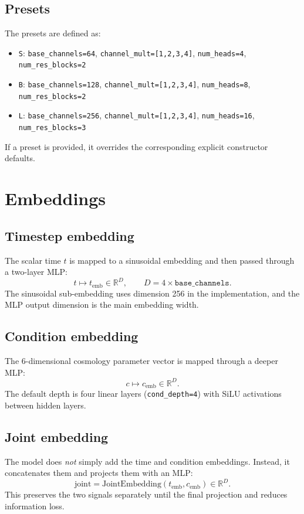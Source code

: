 \documentclass[11pt]{article}
\begin{document}
\subsection{Presets}
The presets are defined as:
\begin{itemize}
  \item \texttt{S}: \texttt{base\_channels=64}, \texttt{channel\_mult=[1,2,3,4]}, \texttt{num\_heads=4}, \texttt{num\_res\_blocks=2}
  \item \texttt{B}: \texttt{base\_channels=128}, \texttt{channel\_mult=[1,2,3,4]}, \texttt{num\_heads=8}, \texttt{num\_res\_blocks=2}
  \item \texttt{L}: \texttt{base\_channels=256}, \texttt{channel\_mult=[1,2,3,4]}, \texttt{num\_heads=16}, \texttt{num\_res\_blocks=3}
\end{itemize}
If a preset is provided, it overrides the corresponding explicit constructor defaults.

\section{Embeddings}
\subsection{Timestep embedding}
The scalar time $t$ is mapped to a sinusoidal embedding and then passed through a two-layer MLP:
\[
t \mapsto t_{\mathrm{emb}} \in \mathbb{R}^{D}, \qquad D = 4 \times \texttt{base\_channels}.
\]
The sinusoidal sub-embedding uses dimension 256 in the implementation, and the MLP output dimension is the main embedding width.

\subsection{Condition embedding}
The 6-dimensional cosmology parameter vector is mapped through a deeper MLP:
\[
c \mapsto c_{\mathrm{emb}} \in \mathbb{R}^{D}.
\]
The default depth is four linear layers (\texttt{cond\_depth=4}) with SiLU activations between hidden layers.

\subsection{Joint embedding}
The model does \emph{not} simply add the time and condition embeddings.
Instead, it concatenates them and projects them with an MLP:
\[
\mathrm{joint} = \mathrm{JointEmbedding}(t_{\mathrm{emb}}, c_{\mathrm{emb}}) \in \mathbb{R}^{D}.
\]
This preserves the two signals separately until the final projection and reduces information loss.
\end{document}
